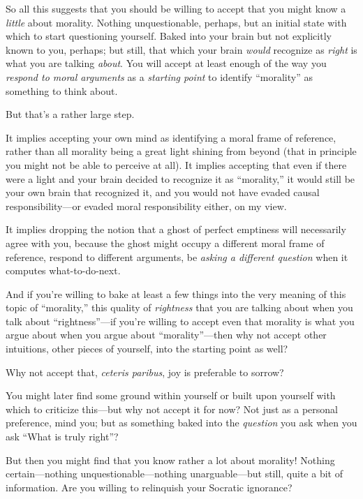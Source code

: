 {
 So all this suggests that you should be willing to accept that you
might know a \textit{little} about morality. Nothing unquestionable,
perhaps, but an initial state with which to start questioning yourself.
Baked into your brain but not explicitly known to you, perhaps; but
still, that which your brain \textit{would} recognize as \textit{right}
is what you are talking \textit{about}. You will accept at least enough
of the way you \textit{respond to moral arguments} as a
\textit{starting point} to identify
``morality'' as something to think
about.}

{
 But that's a rather large step.}

{
 It implies accepting your own mind as identifying a moral frame of
reference, rather than all morality being a great light shining from
beyond (that in principle you might not be able to perceive at all). It
implies accepting that even if there were a light and your brain
decided to recognize it as
``morality,'' it would still be your
own brain that recognized it, and you would not have evaded causal
responsibility---or evaded moral responsibility either, on my view.}

{
 It implies dropping the notion that a ghost of perfect emptiness
will necessarily agree with you, because the ghost might occupy a
different moral frame of reference, respond to different arguments, be
\textit{asking a different question} when it computes what-to-do-next.}

{
 And if you're willing to bake at least a few
things into the very meaning of this topic of
``morality,'' this quality of
\textit{rightness} that you are talking about when you talk about
``rightness''---if
you're willing to accept even that morality is what you
argue about when you argue about
``morality''---then why not accept
other intuitions, other pieces of yourself, into the starting point as
well?}

{
 Why not accept that, \textit{ceteris paribus}, joy is preferable
to sorrow?}

{
 You might later find some ground within yourself or built upon
yourself with which to criticize this---but why not accept it for now?
Not just as a personal preference, mind you; but as something baked
into the \textit{question} you ask when you ask ``What
is truly right''?}

{
 But then you might find that you know rather a lot about morality!
Nothing certain---nothing unquestionable---nothing unarguable---but
still, quite a bit of information. Are you willing to relinquish your
Socratic ignorance?}

